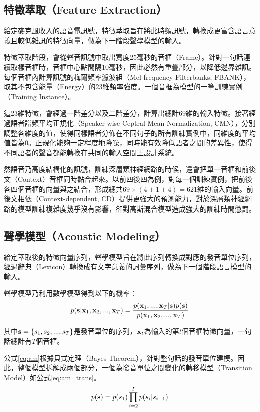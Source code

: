 \subsection{特徵萃取（Feature Extraction）}
給定麥克風收入的語音電訊號，特徵萃取旨在將此時頻訊號，轉換成更富含語言意義且較低雜訊的特徵向量，做為下一階段聲學模型的輸入。

特徵萃取階段，會從聲音訊號中取出寬度25毫秒的音框（Frame）。針對一句話連續取樣音框時，音框中心點間隔10毫秒，因此必然有重疊部分，以降低邊界雜訊。每個音框內計算訊號的梅爾頻率濾波組（Mel-frequency Filterbanks, FBANK），取其不包含能量（Energy）的23維頻率強度。一個音框為模型的一筆訓練實例（Training Instance）。

這23維特徵，會經過一階差分以及二階差分，計算出總計69維的輸入特徵。接著經過語者譜頻平均正規化（Speaker-wise Ceptral Mean Normalization, CMN），分別調整各維度的值，使得同樣語者分佈在不同句子的所有訓練實例中，同維度的平均值皆為0。正規化能夠一定程度地降噪，同時能有效降低語者之間的差異性，使得不同語者的聲音都能轉換在共同的輸入空間上設計系統。

然語音乃高度結構化的訊號，訓練深層類神經網路的時候，還會把單一音框和前後文（Context）音框同時黏合起來。以前四後四為例，對每一個訓練實例，把前後各四個音框的向量與之結合，形成總共$69 \times (4 + 1 + 4) = 621$維的輸入向量。前後文相依（Context-dependent, CD）提供更強大的預測能力，對於深層類神經網路的模型訓練複雜度幾乎沒有影響，卻對高斯混合模型造成強大的訓練時間懲罰。

\subsection{聲學模型（Acoustic Modeling）}
給定萃取後的特徵向量序列，聲學模型旨在將此序列轉換成對應的發音單位序列，經過辭典（Lexicon）轉換成有文字意義的詞彙序列，做為下一個階段語言模型的輸入。

聲學模型乃利用數學模型得到以下的機率：
\begin{equation}\label{eq:am}
p( \bold{s} | \bold{x}_1 , \bold{x}_2 , ... , \bold{x}_T ) = \frac{ p( \bold{x}_1 , ... , \bold{x}_T | \bold{s} )p( \bold{s} )}{ p( \bold{x}_1 , \bold{x}_2 , ... , \bold{x}_T ) }
\end{equation}

其中$\bold{s} = \{s_1 , s_2 , ... , s_T \}$是發音單位的序列，$\bold{x}_t$為輸入的第$t$個音框特徵向量，一句話總計有$T$個音框。

公式\ref{eq:am}根據貝式定理（Bayes Theorem），針對整句話的發音單位建模。因此，整個模型拆解成兩個部分，一個為發音單位之間變化的轉移模型（Transition Model）如公式\ref{eq:am_trans}。
\begin{equation}\label{eq:am_trans}
p( \bold{s}) = p(s_1)\prod_{i=2}^{T} { p( s_i | s_{i-1} ) } 
\end{equation}

